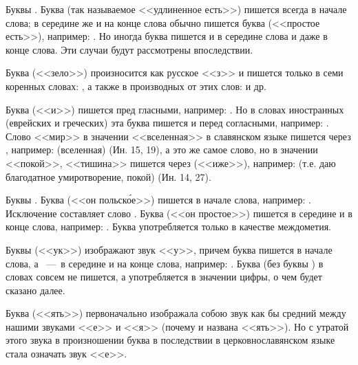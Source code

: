 \documentclass[11pt,a4paper,oneside]{memoir}
\begin{document}
    Буквы {}. Буква {} (так называемое <<удлиненное есть>>) пишется всегда в начале слова; в середине же и на конце слова обычно пишется буква {} (<<простое есть>>), например: {}. Но иногда буква {} пишется и в середине слова и даже в конце слова. Эти случаи будут рассмотрены впоследствии.
    
    Буква {} (<<зело>>) произносится как русское <<з>> и пишется только в семи коренных словах: {}, а также в производных от этих слов: {} и др.
    
    Буква {} (<<и>>) пишется пред гласными, например: {}. Но в словах иностранных (еврейских и греческих) эта буква пишется и перед согласными, например: {}. Слово <<мир>> в значении <<вселенная>> в славянском языке пишется через {}, например: {} (вселенная) (Ин. 15, 19), а это же самое слово, но в значении <<покой>>, <<тишина>> пишется через {} (<<иже>>), например: {} (т.е. даю благодатное умиротворение, покой) (Ин. 14, 27).
    
    Буквы {}. Буква {} (<<он польск\'ое>>) пишется в начале слова, например: {}. Исключение составляет слово {}. Буква {} (<<он простое>>) пишется в середине и в конце слова, например: {}. Буква {} употребляется только в качестве междометия.
    
    Буквы {} (<<ук>>) изображают звук <<у>>, причем буква {} пишется в начале слова, а {}~---~в середине и на конце слова, например: {}. Буква {} (без буквы {}) в словах совсем не пишется, а употребляется в значении цифры, о чем будет сказано далее.
    
    Буква {} (<<ять>>) первоначально изображала собою звук как бы средний между нашими звуками <<е>> и <<я>> (почему и названа <<ять>>). Но с утратой этого звука в произношении буква {} в последствии в церковнославянском языке стала означать звук <<е>>.
    
\end{document}

